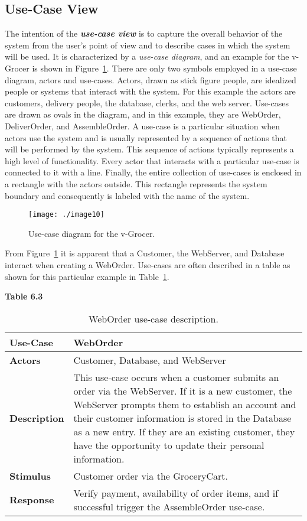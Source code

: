 \subsection{Use-Case View}
\label{subsection:use-case-view}

The intention of the \emph{\textbf{use-case view}} is to capture the
overall behavior of the system from the user's point of view and to
describe cases in which the system will be used. It is characterized by
a \emph{use-case diagram}, and an example for the v-Grocer is shown in
Figure~\ref{figure:useCaseVgrocer}. 
There are only two symbols employed in a use-case diagram,
actors and use-cases. Actors, drawn as stick figure people, are
idealized people or systems that interact with the system. For this
example the actors are customers, delivery people, the database, clerks,
and the web server. Use-cases are drawn as ovals in the diagram, and in
this example, they are WebOrder, DeliverOrder, and AssembleOrder. A
use-case is a particular situation when actors use the system and is
usually represented by a sequence of actions that will be performed by
the system. This sequence of actions typically represents a high level
of functionality. Every actor that interacts with a particular use-case
is connected to it with a line. Finally, the entire collection of
use-cases is enclosed in a rectangle with the actors outside. This
rectangle represents the system boundary and consequently is labeled
with the name of the system.

\begin{figure}
\texttt{[image: ./image10]}
\caption{Use-case diagram for the v-Grocer.}
\label{figure:useCaseVgrocer}
\end{figure}

From Figure~\ref{figure:useCaseVgrocer}
it is apparent that a Customer, the WebServer, and
Database interact when creating a WebOrder. Use-cases are often
described in a table as shown for this particular example in 
Table~\ref{table:webOrderUseCase}.

\textbf{Table 6.3} 


\begin{table}
\caption{WebOrder use-case description.}
\label{table:webOrderUseCase}
\begin{tabular}{|l|m{10cm}|}
\hline
\textbf{Use-Case} & WebOrder \\ \hline
\textbf{Actors} & Customer, Database, and WebServer \\ \hline
\textbf{Description} & This use-case occurs when a customer submits an
order via the WebServer. If it is a new customer, the WebServer prompts
them to establish an account and their customer information is stored in
the Database as a new entry. If they are an existing customer, they have
the opportunity to update their personal information. \\ \hline
\textbf{Stimulus} & Customer order via the GroceryCart. \\ \hline
\textbf{Response} & Verify payment, availability of order items, and if
successful trigger the AssembleOrder use-case. \\ \hline
\end{tabular}
\end{table}

